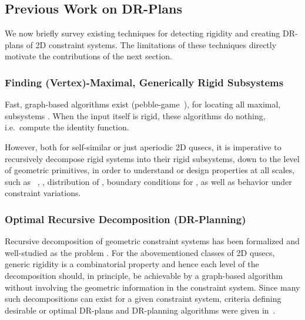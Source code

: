 \subsection{Previous Work on DR-Plans}
\label{sec:prev}
We now briefly survey existing techniques for detecting rigidity and creating DR-plans of 2D constraint systems. The limitations of these techniques directly motivate the contributions of the next  section.

\subsubsection{Finding (Vertex)-Maximal, Generically Rigid Subsystems}
Fast, graph-based algorithms exist (pebble-game~\cite{Jacobs:1997:PG,hoffmann1997solvablesubsets,jermann2006decomposition,Lee:2007:PGA}), for locating all maximal,  subsystems \seedefs. When the input itself is rigid, these algorithms do nothing, i.e.\ compute the identity function.

However, both for self-similar or just aperiodic 2D qusecs, it is imperative to recursively decompose rigid systems into their rigid subsystems, down to the level of geometric primitives, in order to understand or design properties at all scales, such as \seedefs\ , , distribution of , boundary conditions for , as well as behavior under constraint variations.

\subsubsection{Optimal Recursive Decomposition (DR-Planning)}
Recursive decomposition of geometric constraint systems has been formalized \cite{hoffman2001decompositionI,hoffman2001decompositionII} and well-studied \cite{lomonosov2004graph,sitharam2005combinatorial,jermann2006decomposition} as the  problem \seedefsprelim. For the abovementioned classes of 2D qusecs, generic rigidity is a combinatorial property and hence each level of the decomposition should, in principle, be achievable by a graph-based algorithm without involving the geometric information in the constraint system. Since many such decompositions can exist for a given constraint system, criteria defining desirable or optimal DR-plans and DR-planning algorithms were given in~\cite{hoffman2001decompositionI}.

